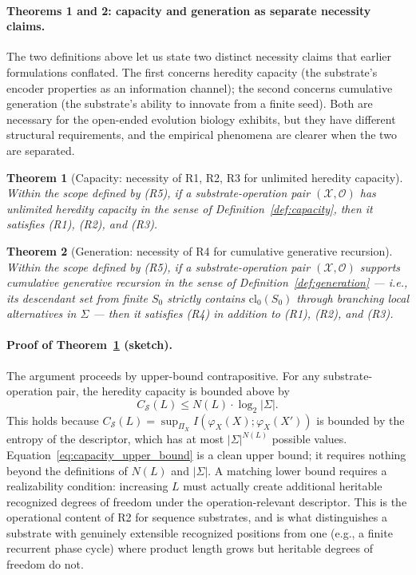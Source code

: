 \documentclass[aps,prx,reprint,amsmath,amssymb,floatfix,superscriptaddress,nofootinbib]{revtex4-2}
\theoremstyle{plain-thm}
\newtheorem{theorem}{Theorem}
\theoremstyle{definition-thm}
\newcommand{\Csub}{C_{\mathcal{S}}}
\newcommand{\descX}{\varphi_X}
\newcommand{\Xset}{\mathcal{X}}
\newcommand{\Op}{\mathcal{O}}
\begin{document}
\paragraph{Theorems 1 and 2: capacity and generation as separate necessity claims.}

The two definitions above let us state two distinct necessity claims that earlier formulations conflated. The first concerns heredity capacity (the substrate's encoder properties as an information channel); the second concerns cumulative generation (the substrate's ability to innovate from a finite seed). Both are necessary for the open-ended evolution biology exhibits, but they have different structural requirements, and the empirical phenomena are clearer when the two are separated.

\begin{theorem}[Capacity: necessity of R1, R2, R3 for unlimited heredity capacity]
\label{thm:capacity}
Within the scope defined by \textnormal{(R5)}, if a substrate-operation pair $(\Xset, \Op)$ has unlimited heredity capacity in the sense of Definition~\ref{def:capacity}, then it satisfies \textnormal{(R1)}, \textnormal{(R2)}, and \textnormal{(R3)}.
\end{theorem}

\begin{theorem}[Generation: necessity of R4 for cumulative generative recursion]
\label{thm:generation}
Within the scope defined by \textnormal{(R5)}, if a substrate-operation pair $(\Xset, \Op)$ supports cumulative generative recursion in the sense of Definition~\ref{def:generation} --- i.e., its descendant set from finite $S_0$ strictly contains $\mathrm{cl}_0(S_0)$ through branching local alternatives in $\Sigma$ --- then it satisfies \textnormal{(R4)} in addition to \textnormal{(R1)}, \textnormal{(R2)}, and \textnormal{(R3)}.
\end{theorem}

\paragraph{Proof of Theorem~\ref{thm:capacity} (sketch).} The argument proceeds by upper-bound contrapositive. For any substrate-operation pair, the heredity capacity is bounded above by
\begin{equation}
\Csub(L) \le N(L) \cdot \log_2 |\Sigma|.
\label{eq:capacity_upper_bound}
\end{equation}
This holds because $\Csub(L) = \sup_{\Pi_X} I(\descX(X); \descX(X'))$ is bounded by the entropy of the descriptor, which has at most $|\Sigma|^{N(L)}$ possible values. Equation~\ref{eq:capacity_upper_bound} is a clean upper bound; it requires nothing beyond the definitions of $N(L)$ and $|\Sigma|$. A matching lower bound requires a realizability condition: increasing $L$ must actually create additional heritable recognized degrees of freedom under the operation-relevant descriptor. This is the operational content of R2 for sequence substrates, and is what distinguishes a substrate with genuinely extensible recognized positions from one (e.g., a finite recurrent phase cycle) where product length grows but heritable degrees of freedom do not.
\end{document}
